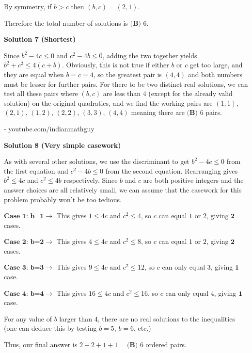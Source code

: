 \begin{enumerate}
 By symmetry, if $b>c$ then $(b,c)=(2,1)$.

 Therefore the total number of solutions is $\boxed{\textbf{(B) } 6}$.

 



\textbf{Solution 7 (Shortest)}

Since $b^{2} - 4c \le 0$ and $c^{2} - 4b \le 0$, adding the two together yields $b^{2} + c^{2} \le 4(c+b)$. Obviously, this is not true if either $b$ or $c$ get too large, and they are equal when $b = c = 4$, so the greatest pair is $(4,4)$ and both numbers must be lesser for further pairs. For there to be two distinct real solutions, we can test all these pairs where $(b,c)$ are less than 4 (except for the already valid solution) on the original quadratics, and we find the working pairs are $(1,1)$, $(2,1)$, $(1,2)$, $(2,2)$, $(3,3)$, $(4,4)$ meaning there are $\boxed{\textbf{(B) } 6}$ pairs.

 - youtube.com/indianmathguy

 



\textbf{Solution 8 (Very simple casework)}

As with several other solutions, we use the discriminant to get $b^2 -4c \leq0$ from the first equation and $c^2 -4b \leq 0$ from the second equation. Rearranging gives $b^2\leq 4c$ and $c^2\leq 4b$ respectively. Since $b$ and $c$ are both positive integers and the answer choices are all relatively small, we can assume that the casework for this problem probably won't be too tedious.

 $\textbf{Case 1: b=1}$$\to$ This gives $1\leq 4c$ and $c^2\leq 4$, so $c$ can equal $1$ or $2$, giving $\textbf{2}$ cases. 

 $\textbf{Case 2: b=2}$$\to$ This gives $4\leq 4c$ and $c^2\leq 8$, so $c$ can equal $1$ or $2$, giving $\textbf{2}$ cases.

 $\textbf{Case 3: b=3}$$\to$ This gives $9\leq 4c$ and $c^2\leq 12$, so $c$ can only equal $3$, giving $\textbf{1}$ case.

 $\textbf{Case 4: b=4}$$\to$ This gives $16\leq 4c$ and $c^2\leq 16$, so $c$ can only equal $4$, giving $\textbf{1}$ case.

 For any value of $b$ larger than $4$, there are no real solutions to the inequalities (one can deduce this by testing $b=5$, $b=6$, etc.)

 Thus, our final answer is $2+2+1+1=\boxed{\textbf{(B) } 6}$ ordered pairs.


\end{enumerate}
